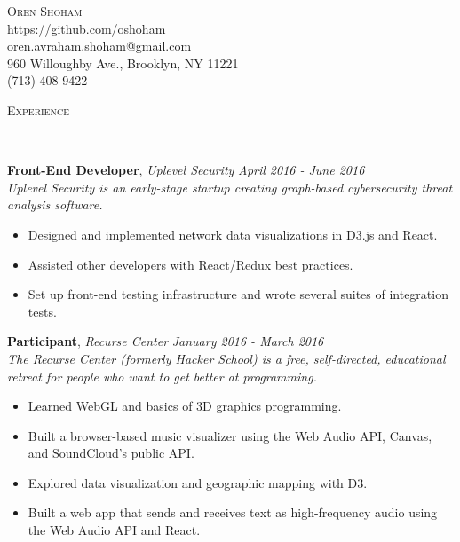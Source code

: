 \documentclass[9pt]{article}
\newenvironment{changemargin}[2]{%
  \begin{list}{}{%
    \setlength{\topsep}{0pt}%
    \setlength{\leftmargin}{#1}%
    \setlength{\rightmargin}{#2}%
    \setlength{\listparindent}{\parindent}%
    \setlength{\itemindent}{\parindent}%
    \setlength{\parsep}{\parskip}%
  }%
  \item[]}{\end{list}
}
\newcommand{\lineover}{
	\begin{changemargin}{-0.05in}{-0.05in}
		\vspace*{-8pt}
		\hrulefill \\
		\vspace*{-2pt}
	\end{changemargin}
}
\newcommand{\header}[1]{
	\begin{changemargin}{-0.5in}{-0.5in}
		\scshape{#1}\\
  	\lineover
	\end{changemargin}
}
\newcommand{\contact}[5]{
	\begin{changemargin}{-0.5in}{-0.5in}
		\begin{center}
			{\Large \scshape {#1}}\\ \smallskip
			{#2}\\ \smallskip 
			{#3}\\ \smallskip
			{#4}\\ \smallskip
			{#5}\smallskip
		\end{center}
	\end{changemargin}
}
\newenvironment{body} {
	\vspace*{-16pt}
	\begin{changemargin}{-0.25in}{-0.5in}
  }	
	{\end{changemargin}
}
\begin{document}

\contact{Oren Shoham}{https://github.com/oshoham}{oren.avraham.shoham@gmail.com}{960 Willoughby Ave., Brooklyn, NY 11221}{(713) 408-9422}



\header{Experience}

\begin{body}
	\vspace{14pt}

	\textbf{Front-End Developer}, \emph{Uplevel Security} \hfill \emph{April 2016 - June 2016}\\
	\emph{Uplevel Security is an early-stage startup creating graph-based cybersecurity threat analysis software.}
	\vspace*{-4pt}
	\begin{itemize} \itemsep -0pt  %
		\item Designed and implemented network data visualizations in D3.js and React.
		\item Assisted other developers with React/Redux best practices.
		\item Set up front-end testing infrastructure and wrote several suites of integration tests.
	\end{itemize}

	\textbf{Participant}, \emph{Recurse Center} \hfill  \emph{January 2016 - March 2016}\\
	\emph{The Recurse Center (formerly Hacker School) is a free, self-directed, educational retreat for people who want to get better at programming.}
	\vspace*{-4pt}
	\begin{itemize} \itemsep -0pt  %
		\item Learned WebGL and basics of 3D graphics programming.
		\item Built a browser-based music visualizer using the Web Audio API, Canvas, and SoundCloud's public API.
		\item Explored data visualization and geographic mapping with D3.
		\item Built a web app that sends and receives text as high-frequency audio using the Web Audio API and React.
	\end{itemize}


\end{body}
\end{document}
